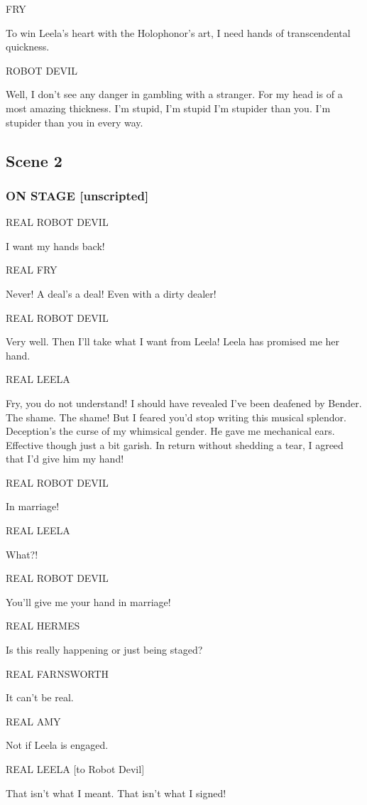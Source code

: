 \documentclass[12pt]{article}
\begin{document}
FRY

To win Leela's heart
with the Holophonor's art,
I need hands of transcendental quickness.

ROBOT DEVIL

Well, I don't see any danger
in gambling with a stranger.
For my head is of a most amazing thickness.
I'm stupid, I'm stupid
I'm stupider than you.
I'm stupider than you in every way.

\subsection*{Scene 2}

\subsubsection*{ON STAGE [unscripted]}

REAL ROBOT DEVIL

I want my hands back!

REAL FRY

Never!
A deal's a deal!
Even with a dirty dealer!

REAL ROBOT DEVIL

Very well.
Then I'll take what I want from Leela!
Leela has promised me her hand.

REAL LEELA

Fry, you do not understand!
I should have revealed I've been deafened by Bender.
The shame. The shame!
But I feared you'd stop writing this musical splendor.
Deception's the curse of my whimsical gender.
He gave me mechanical ears.
Effective though just a bit garish.
In return without shedding a tear, I agreed
that I'd give him my hand!

REAL ROBOT DEVIL

In marriage!

REAL LEELA

What?!

REAL ROBOT DEVIL

You'll give me your hand in marriage!

REAL HERMES

Is this really happening or just being staged?

REAL FARNSWORTH

It can't be real.

REAL AMY

Not if Leela is engaged.

REAL LEELA [to Robot Devil]

That isn't what I meant.
That isn't what I signed!
\end{document}
